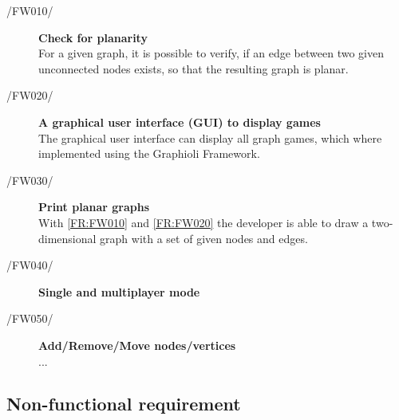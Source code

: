 \vspace{.5cm}

\begin{description}
  	\item[/FW010/\label{FR:FW010}] {\bf Check for planarity}  \hfill \\
  	For a given graph, it is possible to verify, if an edge between two given unconnected nodes exists, so that the resulting graph is planar.
 	\item[/FW020/\label{FR:FW020}] {\bf A graphical user interface (GUI) to display games}  \\
 	The graphical user interface  can display all graph games, which where implemented using the Graphioli Framework.
	\item[/FW030/\label{FR:FW030}] {\bf Print planar graphs}  \\
  	With \ref{FR:FW010} and \ref{FR:FW020} the developer is able to draw a two-dimensional graph with a set of given nodes and edges.
	\item[/FW040/\label{FR:FW040}] {\bf Single and multiplayer mode}  \\
	
	\item[/FW050/\label{FR:FW050}] {\bf Add/Remove/Move nodes/vertices}  \\
	...
	\begin{comment}
		\item[/FW060/\label{FR:FW060}] {\bf Bla}  \\
		...
		\item[/FW070/\label{FR:FW070}] {\bf Bla}  \\
		...
		\item[/FW080/\label{FR:FW080}] {\bf Bla}  \\
		...
		\item[/FW090/\label{FR:FW090}] {\bf Bla}  \\
		...
		\item[/FW100/\label{FR:FW100}] {\bf Bla}  \\
		...
		\item[/FW110/\label{FR:FW110}] {\bf Bla}  \\
		...
		\item[/FW120/\label{FR:FW120}] {\bf Bla}  \\
		...
		\item[/FW130/\label{FR:FW130}] {\bf Bla}  \\
		...
		\item[/FW140/\label{FR:FW140}] {\bf Bla}  \\
		...
		\item[/FW150/\label{FR:FW150}] {\bf Bla}  \hfill \\
		...
	\end{comment}
\end{description}

\subsection{Non-functional requirement}